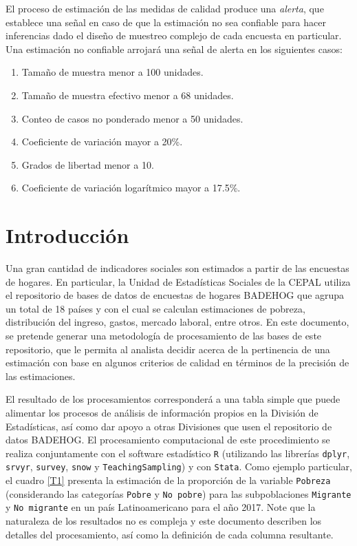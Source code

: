 \documentclass[12pt,spanish,]{book}
\providecommand{\tightlist}{%
  \setlength{\itemsep}{0pt}\setlength{\parskip}{0pt}}
\begin{document}
El proceso de estimación de las medidas de calidad produce una \emph{alerta}, que establece una señal en caso de que la estimación no sea confiable para hacer inferencias dado el diseño de muestreo complejo de cada encuesta en particular. Una estimación no confiable arrojará una señal de alerta en los siguientes casos:

\begin{enumerate}
\def\labelenumi{\arabic{enumi}.}
\tightlist
\item
  Tamaño de muestra menor a 100 unidades.
\item
  Tamaño de muestra efectivo menor a 68 unidades.
\item
  Conteo de casos no ponderado menor a 50 unidades.
\item
  Coeficiente de variación mayor a 20\%.
\item
  Grados de libertad menor a 10.
\item
  Coeficiente de variación logarítmico mayor a 17.5\%.
\end{enumerate}

\hypertarget{introduccion-1}{%
\section{Introducción}\label{introduccion-1}}

Una gran cantidad de indicadores sociales son estimados a partir de las encuestas de hogares. En particular, la Unidad de Estadísticas Sociales de la CEPAL utiliza el repositorio de bases de datos de encuestas de hogares BADEHOG que agrupa un total de 18 países y con el cual se calculan estimaciones de pobreza, distribución del ingreso, gastos, mercado laboral, entre otros. En este documento, se pretende generar una metodología de procesamiento de las bases de este repositorio, que le permita al analista decidir acerca de la pertinencia de una estimación con base en algunos criterios de calidad en términos de la precisión de las estimaciones.

El resultado de los procesamientos corresponderá a una tabla simple que puede alimentar los procesos de análisis de información propios en la División de Estadísticas, así como dar apoyo a otras Divisiones que usen el repositorio de datos BADEHOG. El procesamiento computacional de este procedimiento se realiza conjuntamente con el software estadístico \texttt{R} (utilizando las librerías \texttt{dplyr}, \texttt{srvyr}, \texttt{survey}, \texttt{snow} y \texttt{TeachingSampling}) y con \texttt{Stata}. Como ejemplo particular, el cuadro \ref{T1} presenta la estimación de la proporción de la variable \texttt{Pobreza} (considerando las categorías \texttt{Pobre} y \texttt{No\ pobre}) para las subpoblaciones \texttt{Migrante} y \texttt{No\ migrante} en un país Latinoamericano para el año 2017. Note que la naturaleza de los resultados no es compleja y este documento describen los detalles del procesamiento, así como la definición de cada columna resultante.
\end{document}
